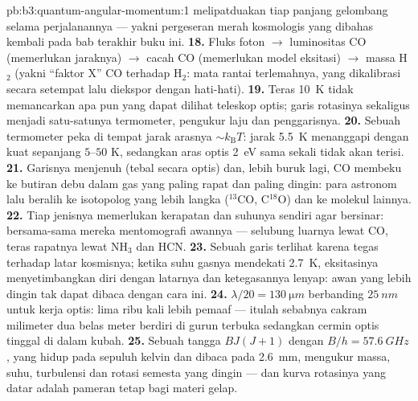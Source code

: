 \begin{solution}{pb:b3:quantum-angular-momentum:1}
melipatduakan tiap panjang gelombang selama perjalanannya --- yakni
pergeseran merah kosmologis yang dibahas kembali pada bab terakhir buku
ini.
\textbf{18.} Fluks foton $\to$ luminositas CO (memerlukan jaraknya)
$\to$ cacah CO (memerlukan model eksitasi) $\to$ massa H$_2$ (yakni
``faktor X'' CO terhadap H$_2$: mata rantai terlemahnya, yang
dikalibrasi secara setempat lalu diekspor dengan hati-hati).
\textbf{19.} Teras \qty{10}{K} tidak memancarkan apa pun yang dapat
dilihat teleskop optis; garis rotasinya sekaligus menjadi satu-satunya
termometer, pengukur laju dan penggarisnya.
\textbf{20.} Sebuah termometer peka di tempat jarak arasnya $\sim
k_{\text{B}}T$: jarak \qty{5.5}{K} menanggapi dengan kuat sepanjang
$5$--$50$ K, sedangkan aras optis \qty{2}{eV} sama sekali tidak akan
terisi.
\textbf{21.} Garisnya menjenuh (tebal secara optis) dan, lebih buruk
lagi, CO membeku ke butiran debu dalam gas yang paling rapat dan paling
dingin: para astronom lalu beralih ke isotopolog yang lebih langka
($^{13}$CO, C$^{18}$O) dan ke molekul lainnya.
\textbf{22.} Tiap jenisnya memerlukan kerapatan dan suhunya sendiri agar
bersinar: bersama-sama mereka mentomografi awannya --- selubung luarnya
lewat CO, teras rapatnya lewat NH$_3$ dan HCN.
\textbf{23.} Sebuah garis terlihat karena tegas terhadap latar
kosmisnya; ketika suhu gasnya mendekati \qty{2.7}{K}, eksitasinya
menyetimbangkan diri dengan latarnya dan ketegasannya lenyap: awan yang
lebih dingin tak dapat dibaca dengan cara ini.
\textbf{24.} $\lambda/20 = \qty{130}{\micro m}$ berbanding
$\qty{25}{nm}$ untuk kerja optis: lima ribu kali lebih pemaaf ---
itulah sebabnya cakram milimeter dua belas meter berdiri di gurun
terbuka sedangkan cermin optis tinggal di dalam kubah.
\textbf{25.} Sebuah tangga $BJ(J+1)$ dengan $B/h = \qty{57.6}{GHz}$,
yang hidup pada sepuluh kelvin dan dibaca pada \qty{2.6}{mm}, mengukur
massa, suhu, turbulensi dan rotasi semesta yang dingin --- dan kurva
rotasinya yang datar adalah pameran tetap bagi materi gelap.
\end{solution}
